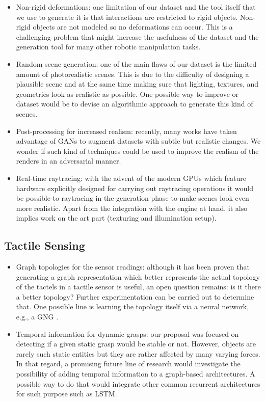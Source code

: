 \begin{itemize}
    \item Non-rigid deformations: one limitation of our dataset and the tool itself that we use to generate it is that interactions are restricted to rigid objects. Non-rigid objects are not modeled so no deformations can occur. This is a challenging problem that might increase the usefulness of the dataset and the generation tool for many other robotic manipulation tasks.
    \item Random scene generation: one of the main flaws of our dataset is the limited amount of photorealistic scenes. This is due to the difficulty of designing a plausible scene and at the same time making sure that lighting, textures, and geometries look as realistic as possible. One possible way to improve or dataset would be to devise an algorithmic approach to generate this kind of scenes.
    \item Post-processing for increased realism: recently, many works have taken advantage of \acp{GAN} to augment datasets with subtle but realistic changes. We wonder if such kind of techniques could be used to improve the realism of the renders in an adversarial manner.
    \item Real-time raytracing: with the advent of the modern \acp{GPU} which feature hardware explicitly designed for carrying out raytracing operations it would be possible to raytracing in the generation phase to make scenes look even more realistic. Apart from the integration with the engine at hand, it also implies work on the art part (texturing and illumination setup).
\end{itemize}

\subsection{Tactile Sensing}

\begin{itemize}
    \item Graph topologies for the sensor readings: although it has been proven that generating a graph representation which better represents the actual topology of the tactels in a tactile sensor is useful, an open question remains: is it there a better topology? Further experimentation can be carried out to determine that. One possible line is learning the topology itself via a neural network, e.g., a \ac{GNG} \cite{Fritzke1999}.
    \item Temporal information for dynamic grasps: our proposal was focused on detecting if a given static grasp would be stable or not. However, objects are rarely such static entities but they are rather affected by many varying forces. In that regard, a promising future line of research would investigate the possibility of adding temporal information to a graph-based architectures. A possible way to do that would integrate other common recurrent architectures for such purpose such as \acl{LSTM}.
\end{itemize}